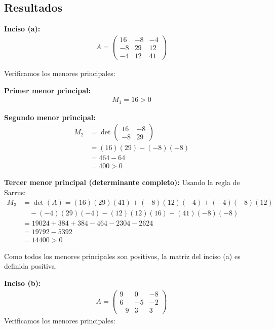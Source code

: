 \documentclass{article}
\begin{document}
\subsection{Resultados}
\setcounter{equation}{0}

\textbf{Inciso (a):}
\begin{align}
    A=\begin{pmatrix} 16 & -8 & -4\\ -8 & 29 & 12\\ -4 & 12 & 41 \end{pmatrix}
\end{align}

Verificamos los menores principales:

\textbf{Primer menor principal:}
\begin{align}
M_1 = 16 > 0
\end{align}

\textbf{Segundo menor principal:}
\begin{align}
M_2 &= \det\begin{pmatrix} 16 & -8 \\ -8 & 29 \end{pmatrix} \\
&= (16)(29) - (-8)(-8) \\
&= 464 - 64 \\
&= 400 > 0
\end{align}

\textbf{Tercer menor principal (determinante completo):}
Usando la regla de Sarrus:
\begin{align}
M_3 &= \det(A) = (16)(29)(41) + (-8)(12)(-4) + (-4)(-8)(12) \\
&\quad - (-4)(29)(-4) - (12)(12)(16) - (41)(-8)(-8) \\
&= 19024 + 384 + 384 - 464 - 2304 - 2624 \\
&= 19792 - 5392 \\
&= 14400 > 0
\end{align}

Como todos los menores principales son positivos, la matriz del inciso (a) es definida positiva.

\textbf{Inciso (b):}
\begin{align}
     A=\begin{pmatrix} 9 & 0 & -8\\ 6 & -5 & -2\\ -9 & 3 & 3 \end{pmatrix}
\end{align}
Verificamos los menores principales:
\end{document}
